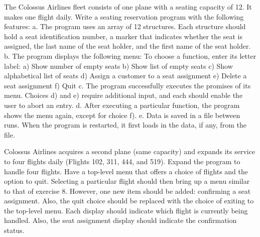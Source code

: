 \begin{question}
The Colossus Airlines fleet consists of one plane with a seating capacity of 12. It makes
one flight daily. Write a seating reservation program with the following features:
a. The program uses an array of 12 structures. Each structure should hold a seat
identification number, a marker that indicates whether the seat is assigned, the last
name of the seat holder, and the first name of the seat holder.
b. The program displays the following menu:
To choose a function, enter its letter label:
a) Show number of empty seats
b) Show list of empty seats
c) Show alphabetical list of seats
d) Assign a customer to a seat assignment
e) Delete a seat assignment
f) Quit
c. The program successfully executes the promises of its menu. Choices d) and e)
require additional input, and each should enable the user to abort an entry.
d. After executing a particular function, the program shows the menu again, except
for choice f).
e. Data is saved in a file between runs. When the program is restarted, it first loads in
the data, if any, from the file.

Colossus Airlines acquires a second plane (same capacity) and expands
its service to four flights daily (Flights 102, 311, 444, and 519). Expand the program to
handle four flights. Have a top-level menu that offers a choice of flights and the option
to quit. Selecting a particular flight should then bring up a menu similar to that of
exercise 8. However, one new item should be added: confirming a seat assignment. Also,
the quit choice should be replaced with the choice of exiting to the top-level menu. Each
display should indicate which flight is currently being handled. Also, the seat assignment
display should indicate the confirmation status.
\end{question}
